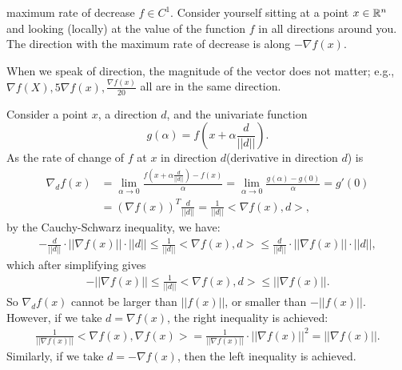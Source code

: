 \begin{lemma}{}{maximum rate of decrease}
    $f\in C^1$. Consider yourself sitting at a point $x\in \mathbb{R}^n$ and looking (locally) at
    the value of the function $f$ in all directions around you. The direction with the
    maximum rate of decrease is along $-\nabla f(x)$. 
\end{lemma}


\begin{remark}
    When we speak of direction, the magnitude of the vector does not
matter; e.g., $\nabla f(X), 5\nabla f(x), \frac{\nabla f(x)}{20}$
 all are in the same direction.
\end{remark}

\begin{proofsolution}
    Consider a point $x$, a direction $d$, and the univariate function
    \begin{equation*}
        g(\alpha) = f(x+\alpha \frac{d}{||d||}). 
    \end{equation*}
    As the rate of change of $f$ at $x$ in direction $d$(derivative in direction $d$) is
    \begin{align*}
        \nabla_d f(x) &= \lim_{\alpha \rightarrow 0}\frac{f(x+\alpha \frac{d}{||d||}) - f(x)}{\alpha}=\lim_{\alpha\rightarrow 0}\frac{g(\alpha)-g(0)}{\alpha}=g'(0)\\
                &=(\nabla f(x))^T\frac{d}{||d||}=\frac{1}{||d||}<\nabla f(x),d>, 
    \end{align*}
    by the Cauchy-Schwarz inequality, we have:
    \begin{align*}
        -\frac{d}{||d||}\cdot ||\nabla f(x)|| \cdot ||d||\leq \frac{1}{||d||}<\nabla f(x),d>\leq \frac{d}{||d||}\cdot ||\nabla f(x)|| \cdot ||d||, 
    \end{align*}
    which after simplifying gives
    \begin{align*}
        -||\nabla f(x)|| \leq \frac{1}{||d||}<\nabla f(x),d>\leq||\nabla f(x)|| .  
    \end{align*}
    So $\nabla_d f(x)$ cannot be larger than $||f(x)||$, or smaller than $-||f(x)||$. However, if we take $d=\nabla f(x)$, the right inequality is achieved:
    \begin{align*}
        \frac{1}{||\nabla f(x)||}<\nabla f(x),\nabla f(x)>=\frac{1}{||\nabla f(x)||}\cdot ||\nabla f(x)||^2=||\nabla f(x)||. 
    \end{align*}
    Similarly, if we take $d=-\nabla f(x)$, then the left inequality is achieved. 
\end{proofsolution}


